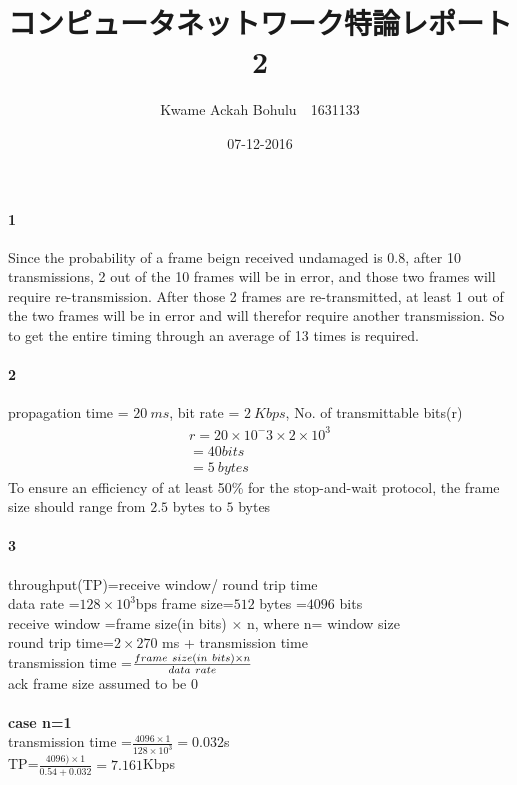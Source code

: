 \documentclass[24 pts]{article}
\title{コンピュータネットワーク特論レポート2	 }
\date{07-12-2016}
\author{Kwame Ackah Bohulu　1631133}
\begin{document}
\maketitle
\newpage
\paragraph{1}
Since the probability of a frame beign received undamaged is 0.8, after 10 transmissions, 2 out of the 10 frames will be in error, and those two frames will require re-transmission. After those 2 frames are re-transmitted, at least 1 out of the two frames will be in error and will therefor require another transmission. So to get the entire timing through an average of 13 times is required.
\newpage
\paragraph{2}
propagation time = $20\ ms$,
bit rate = $2\ Kbps$, No. of transmittable bits(r)
\begin{equation*}
\begin{split}
 r=20\times 10^-3 \times 2 \times10^3\\
=40 bits\\
=5 \ bytes
\end{split}
\end{equation*}
To ensure an efficiency of at least 50\% for the stop-and-wait protocol, the frame size should range from $2.5$ bytes to $5$ bytes  

\paragraph{3}
throughput(TP)=receive window/ round trip time\\
data rate =$128\times10^3$bps
frame size=$512$ bytes =$4096$ bits\\
receive window =frame size(in bits) $\times$ n, where n= window size\\
round trip time=$2\times 270$ ms + transmission time\\
transmission time =$\frac{frame \\\ size(in \\\ bits)\times n}{data \ rate}$\\
ack frame size assumed to be 0
\paragraph{}
\textbf{case n=1}\\
transmission time =$\frac{4096\times 1}{128\times 10^3}= 0.032$s\\
TP=$\frac{4096)\times 1}{0.54+0.032}=7.161$Kbps\\
\end{document}
